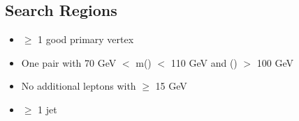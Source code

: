%
%
%
%
%
%

\clearpage
\subsection{Search Regions}\label{sec:searhregion}

\begin{itemize}
  \item $\geq$ 1 good primary vertex
  \item One \dilepton pair with 70 GeV $<$ m(\dilepton) $<$ 110 GeV and \pt(\dilepton) $>$ 100 GeV
  \item No additional leptons with \pt $\geq$ 15 GeV
  \item $\geq$ 1 jet
\end{itemize}

